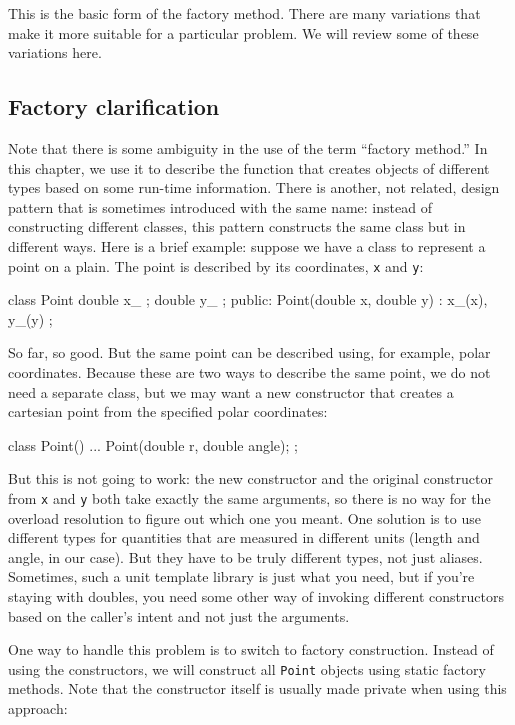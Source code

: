 This is the basic form of the factory method. There are many variations that make it more suitable for a particular problem. We will review some of these variations here.

\subsection{Factory clarification}

Note that there is some ambiguity in the use of the term ``factory method.'' In this chapter, we use it to describe the function that creates objects of different types based on some run-time information. There is another, not related, design pattern that is sometimes introduced with the same name: instead of constructing different classes, this pattern constructs the same class but in different ways. Here is a brief example: suppose we have a class to represent a point on a plain. The point is described by its coordinates, \texttt{x} and \texttt{y}:

\begin{code}
class Point {
  double x_ {};
  double y_ {};
  public:
  Point(double x, double y) : x_(x), y_(y) {}
};
\end{code}

So far, so good. But the same point can be described using, for example, polar coordinates. Because these are two ways to describe the same point, we do not need a separate class, but we may want a new constructor that creates a cartesian point from the specified polar coordinates:

\begin{code}
class Point() {
  ...
  Point(double r, double angle);
};
\end{code}

But this is not going to work: the new constructor and the original constructor from \texttt{x} and \texttt{y} both take exactly the same arguments, so there is no way for the overload resolution to figure out which one you meant. One solution is to use different types for quantities that are measured in different units (length and angle, in our case). But they have to be truly different types, not just aliases. Sometimes, such a unit template library is just what you need, but if you're staying with doubles, you need some other way of invoking different constructors based on the caller's intent and not just the arguments.

One way to handle this problem is to switch to factory construction. Instead of using the constructors, we will construct all \texttt{Point} objects using static factory methods. Note that the constructor itself is usually made private when using this approach:


